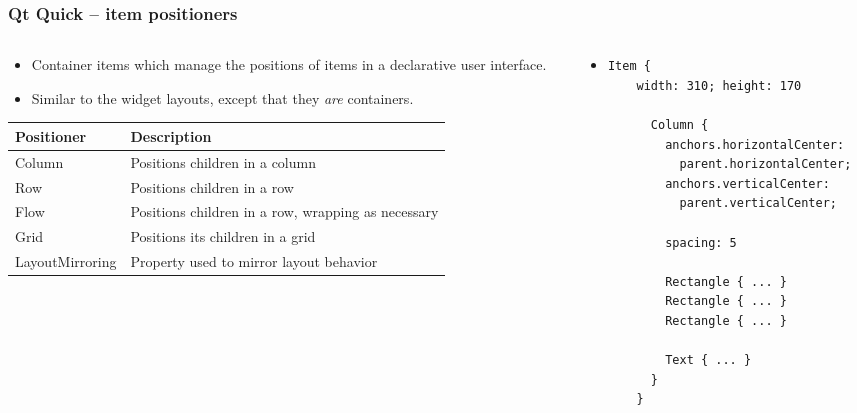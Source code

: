 \begin{frame}[fragile]
  \frametitle{Qt Quick -- item positioners}
    \footnotesize
    \begin{columns}
      \begin{column}{0.55\textwidth}
      \begin{itemize}
        \item Container items which manage the positions of items in
          a declarative user interface.
        \item Similar to the widget layouts, except that they {\em are} containers.
      \end{itemize}
      \scriptsize
      \begin{tabular}{|p{}|p{}|}
        \hline
        \textbf{Positioner} & \textbf{Description} \\
        \hline
        Column & Positions children in a column \\
        \hline
        Row & Positions children in a row \\
        \hline
        Flow & Positions children in a row, wrapping as necessary \\
        \hline
        Grid & Positions its children in a grid \\
        \hline
        Layout\-Mirroring & Property used to mirror layout behavior \\
        \hline
      \end{tabular}
      \end{column}
      \begin{column}{0.45\textwidth}
      \begin{itemize}
        \item 
        \begin{lstlisting}[basicstyle=\tiny\ttfamily]
	Item {
	width: 310; height: 170

	  Column {
	    anchors.horizontalCenter:
	      parent.horizontalCenter;
	    anchors.verticalCenter:
	      parent.verticalCenter;

	    spacing: 5

	    Rectangle { ... }
	    Rectangle { ... }
	    Rectangle { ... }

	    Text { ... }
	  }
	}
        \end{lstlisting}
      \end{itemize}
      \end{column}
    \end{columns}
\end{frame}

